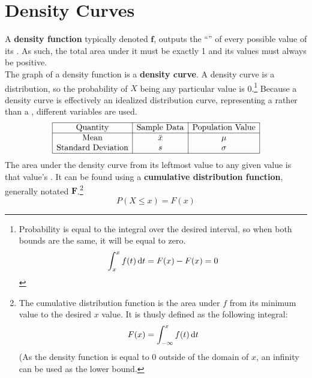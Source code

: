 \documentclass[../AP_Statistics.tex]{subfiles}
\begin{document}
		\section{Density Curves}
			A \textbf{density function} typically denoted $\bm{f}$, outputs the \enquote{} of every possible value of its . As such, the total area under it must be exactly 1 and its values must always be positive. \\
			The graph of a density function is a \textbf{density curve}.
			A density curve is a  distribution, so the probability of $X$ being any particular value is 0.\footnote{Probability is equal to the integral over the desired interval, so when both bounds are the same, it will be equal to zero.\[\int_x^xf(t)\,\mathrm{d} t = F(x) - F(x) = 0\]}
			Because a density curve is effectively an idealized distribution curve, representing a  rather than a , different variables are used. \\ 
			\[\begin{array}{|c|c|c|}\hline
				\mathrm{Quantity} & \text{Sample Data} & \text{Population Value} \\\hline
				\mathrm{Mean} & \bar{x} & \mu \\
				\text{Standard Deviation} & s & \sigma \\\hline
			\end{array}\]
			The area under the density curve from its leftmost value to any given value is that value's . It can be found using a \textbf{cumulative distribution function}, generally notated $\bm{F}$.\footnote{The cumulative distribution function is the area under $f$ from its minimum value to the desired $x$ value. It is thusly defined as the following integral:\[F(x) = \int_{-\infty}^xf(t)\,\mathrm{d} t\](As the density function is equal to 0 outside of the domain of $x$, an infinity can be used as the lower bound.}
			\[P(X \le x) = F(x)\]
\end{document}
